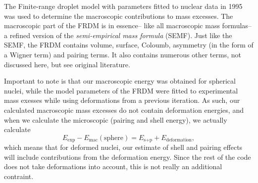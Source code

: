 The Finite-range droplet model with parameters fitted to nuclear data in 1995\cite{moller1995} was used to determine the macroscopic contributions to mass excesses. The macroscopic part of the FRDM is in essence-- like all macroscopic mass formulas-- a refined version of the \emph{semi-empirical mass formula} (SEMF). Just like the SEMF, the FRDM contains volume, surface, Coloumb, asymmetry (in the form of a Wigner term) and pairing terms. It also contains numerous other terms, not discussed here, but see original literature\cite{moller1995}.

Important to note is that our macroscopic energy was obtained for spherical nuclei, while the model parameters of the FRDM were fitted to experimental mass exesses while using deformations from a previous iteration. As such, our calculated macroscopic mass excesses do not contain deformation energies, and when we calculate the microscopic (pairing and shell energy), we actually calculate
\begin{equation}
E_\text{exp} - E_\text{mac}(\text{sphere}) = E_{\text{s}+\text{p}} + E_\text{deformation},
\end{equation}
which means that for deformed nuclei, our estimate of shell and pairing effects will include contributions from the deformation energy.
Since the rest of the code does not take deformations into account, this is not really an additional contraint.%

